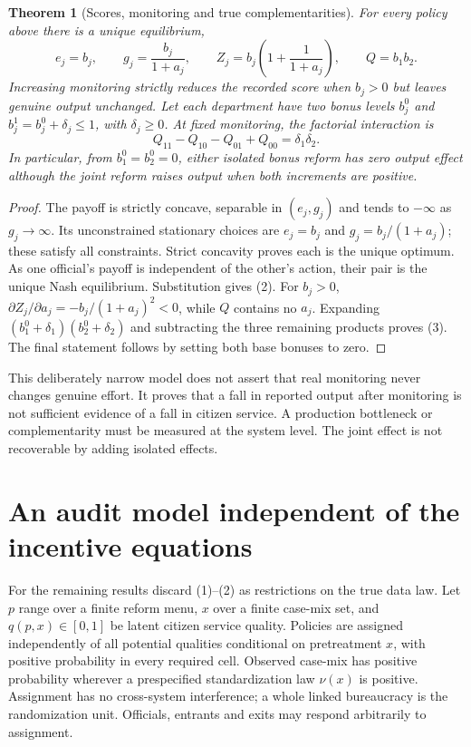 \documentclass[11pt]{article}
\newtheorem{theorem}{Theorem}
\begin{document}
\begin{theorem}[Scores, monitoring and true complementarities]\label{game}
For every policy above there is a unique equilibrium,
\[
 e_j=b_j,\qquad g_j=\frac{b_j}{1+a_j},\qquad
 Z_j=b_j\left(1+\frac1{1+a_j}\right),\qquad Q=b_1b_2.          \tag{2}
\]
Increasing monitoring strictly reduces the recorded score when $b_j>0$
but leaves genuine output unchanged. Let each department have two bonus
levels $b_j^0$ and $b_j^1=b_j^0+\delta_j\leq1$, with $\delta_j\geq0$.
At fixed monitoring, the factorial interaction is
\[
 Q_{11}-Q_{10}-Q_{01}+Q_{00}=\delta_1\delta_2.                 \tag{3}
\]
In particular, from $b_1^0=b_2^0=0$, either isolated bonus reform has zero
output effect although the joint reform raises output when both increments
are positive.
\end{theorem}
\begin{proof}
The payoff is strictly concave, separable in $(e_j,g_j)$ and tends to
$-\infty$ as $g_j\to\infty$. Its unconstrained stationary choices are
$e_j=b_j$ and $g_j=b_j/(1+a_j)$; these satisfy all constraints.
Strict concavity proves each is the unique optimum. As one official's
payoff is independent of the other's action, their pair is the unique
Nash equilibrium. Substitution gives (2). For $b_j>0$,
$\partial Z_j/\partial a_j=-b_j/(1+a_j)^2<0$, while $Q$ contains no
$a_j$. Expanding $(b_1^0+\delta_1)(b_2^0+\delta_2)$ and subtracting the
three remaining products proves (3). The final statement follows by
setting both base bonuses to zero.
\end{proof}
This deliberately narrow model does not assert that real monitoring never
changes genuine effort. It proves that a fall in reported output after
monitoring is not sufficient evidence of a fall in citizen service.
A production bottleneck or complementarity must be measured at the system
level. The joint effect is not recoverable by adding isolated effects.

\section{An audit model independent of the incentive equations}
For the remaining results discard (1)--(2) as restrictions on the true data
law. Let $p$ range over a finite reform menu, $x$ over a finite case-mix set,
and $q(p,x)\in[0,1]$ be latent citizen service quality. Policies are assigned
independently of all potential qualities conditional on pretreatment $x$,
with positive probability in every required cell. Observed case-mix has
positive probability wherever a prespecified standardization law $\nu(x)$
is positive. Assignment has no cross-system interference; a whole linked
bureaucracy is the randomization unit. Officials, entrants and exits may
respond arbitrarily to assignment.
\end{document}
